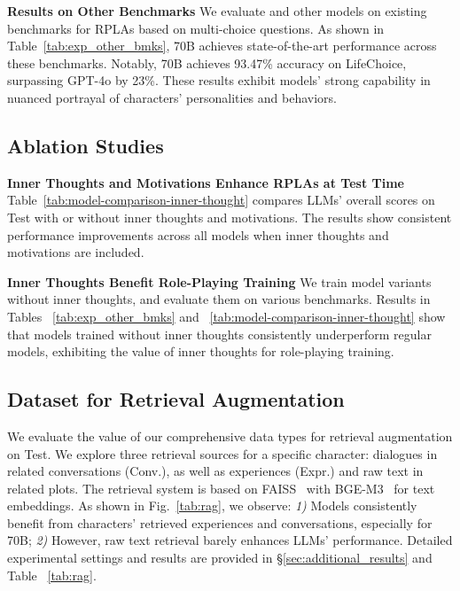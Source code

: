 \textbf{Results on Other Benchmarks} \quad 
We evaluate \method and other models on existing benchmarks for RPLAs based on multi-choice questions. 
As shown in Table~\ref{tab:exp_other_bmks}, \method 70B achieves state-of-the-art performance across these benchmarks. 
Notably, \method 70B achieves 93.47\% accuracy on LifeChoice, surpassing GPT-4o by 23\%. 
These results exhibit \method models' strong capability in nuanced portrayal of characters' personalities and behaviors. 




\subsection{Ablation Studies}


\textbf{Inner Thoughts and Motivations Enhance RPLAs at Test Time} \quad 
Table~\ref{tab:model-comparison-inner-thought} compares LLMs' overall scores on \method Test with or without inner thoughts and  motivations. 
The results show consistent performance improvements across all models when inner thoughts and motivations are included. 


\textbf{Inner Thoughts Benefit Role-Playing Training} \quad 
We train \method model variants without inner thoughts, and evaluate them on various benchmarks.  
Results in Tables ~\ref{tab:exp_other_bmks} and ~\ref{tab:model-comparison-inner-thought}  show that models trained without inner thoughts consistently underperform regular \method models, exhibiting the value of inner thoughts for role-playing training.




        
\subsection{\method Dataset for Retrieval Augmentation}


We evaluate the value of our comprehensive data types for retrieval augmentation on \method Test. 
We explore three retrieval sources for a specific character: 
dialogues in related conversations (Conv.), as well as experiences (Expr.) and raw text in related plots. 
The retrieval system is based on FAISS~\citep{douze2024faiss} with BGE-M3~\citep{chen2024bge} for text embeddings.
As shown in Fig.~\ref{tab:rag}, we observe:
\textit{1)} Models consistently benefit from characters' retrieved experiences and conversations, especially for \method 70B;
\textit{2)} However, raw text retrieval barely enhances LLMs' performance. 
Detailed experimental settings and results are provided in \S\ref{sec:additional_results} and Table ~\ref{tab:rag}.


